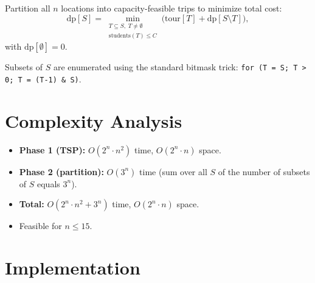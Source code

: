 \documentclass[11pt,a4paper]{article}
\begin{document}
Partition all $n$ locations into capacity-feasible trips to minimize total
cost:
\[
  \text{dp}[S] = \min_{\substack{T \subseteq S,\; T \ne \emptyset \\
    \text{students}(T) \le C}}
    \bigl(\text{tour}[T] + \text{dp}[S \setminus T]\bigr),
\]
with $\text{dp}[\emptyset] = 0$.

Subsets of $S$ are enumerated using the standard bitmask trick:
\texttt{for (T = S; T > 0; T = (T-1) \& S)}.

\section{Complexity Analysis}

\begin{itemize}
  \item \textbf{Phase 1 (TSP):} $O(2^n \cdot n^2)$ time, $O(2^n \cdot n)$
    space.
  \item \textbf{Phase 2 (partition):} $O(3^n)$ time (sum over all $S$ of the
    number of subsets of $S$ equals $3^n$).
  \item \textbf{Total:} $O(2^n \cdot n^2 + 3^n)$ time, $O(2^n \cdot n)$
    space.
  \item Feasible for $n \le 15$.
\end{itemize}

\section{Implementation}
\end{document}
